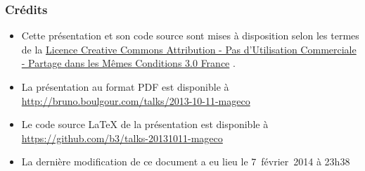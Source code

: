 \documentclass{beamer}
\begin{document}

\begin{frame}
  \frametitle{Crédits}

  \small

  \begin{itemize}
  \item Cette présentation et son code source sont mises à disposition
    selon les termes de la
    \href{https://creativecommons.org/licenses/by-nc-sa/3.0/fr/legalcode}{Licence
      Creative Commons Attribution - Pas d’Utilisation Commerciale - Partage
      dans les Mêmes Conditions 3.0 France} \ccbyncsa.

    \vfill

  \item La présentation au format PDF est disponible à {\footnotesize\url{http://bruno.boulgour.com/talks/2013-10-11-mageco}}

    \vfill

  \item Le code source LaTeX de la présentation est disponible à {\footnotesize\url{https://github.com/b3/talks-20131011-mageco}}

    \vfill
  \item La dernière modification de ce document a eu lieu le 7~février~2014 à 23h38 %
  \end{itemize}
\end{frame}
\end{document}
